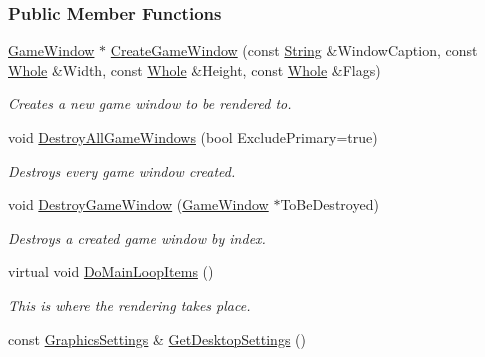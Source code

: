 \subsubsection*{Public Member Functions}
\begin{DoxyCompactItemize}
\item 
\hyperlink{classphys_1_1GameWindow}{GameWindow} $\ast$ \hyperlink{classphys_1_1GraphicsManager_a31c4d90e4ee016b96b7f4e78e20d87a0}{CreateGameWindow} (const \hyperlink{namespacephys_aa03900411993de7fbfec4789bc1d392e}{String} \&WindowCaption, const \hyperlink{namespacephys_a460f6bc24c8dd347b05e0366ae34f34a}{Whole} \&Width, const \hyperlink{namespacephys_a460f6bc24c8dd347b05e0366ae34f34a}{Whole} \&Height, const \hyperlink{namespacephys_a460f6bc24c8dd347b05e0366ae34f34a}{Whole} \&Flags)
\begin{DoxyCompactList}\small\item\em Creates a new game window to be rendered to. \item\end{DoxyCompactList}\item 
void \hyperlink{classphys_1_1GraphicsManager_a2824743d519bcc98abe5c95d0180c73c}{DestroyAllGameWindows} (bool ExcludePrimary=true)
\begin{DoxyCompactList}\small\item\em Destroys every game window created. \item\end{DoxyCompactList}\item 
void \hyperlink{classphys_1_1GraphicsManager_a814eb66a4da0075dc8f46199a4716241}{DestroyGameWindow} (\hyperlink{classphys_1_1GameWindow}{GameWindow} $\ast$ToBeDestroyed)
\begin{DoxyCompactList}\small\item\em Destroys a created game window by index. \item\end{DoxyCompactList}\item 
virtual void \hyperlink{classphys_1_1GraphicsManager_a72e5dc563c6947cded348f19d3df41ee}{DoMainLoopItems} ()
\begin{DoxyCompactList}\small\item\em This is where the rendering takes place. \item\end{DoxyCompactList}\item 
const \hyperlink{structphys_1_1GraphicsSettings}{GraphicsSettings} \& \hyperlink{classphys_1_1GraphicsManager_ab2b1a8f5e714454f26f936bd746b256a}{GetDesktopSettings} ()

\end{DoxyCompactItemize}

